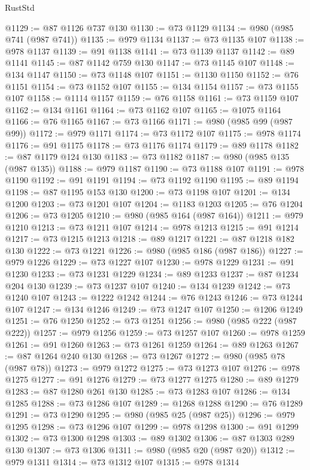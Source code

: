 \begin{lexlean}{RustStd}
\begin{coremodule}
@1129 := @87 @1126 @737 @130
@1130 := @73 @1129
@1134 := @980 (@985 @741 (@987 @741))
@1135 := @979 @1134
@1137 := @73 @1135 @107
@1138 := @978 @1137
@1139 := @91 @1138
@1141 := @73 @1139 @1137
@1142 := @89 @1141
@1145 := @87 @1142 @759 @130
@1147 := @73 @1145 @107
@1148 := @134 @1147
@1150 := @73 @1148 @107
@1151 := @1130 @1150
@1152 := @76 @1151
@1154 := @73 @1152 @107
@1155 := @134 @1154
@1157 := @73 @1155 @107
@1158 := @1114 @1157
@1159 := @76 @1158
@1161 := @73 @1159 @107
@1162 := @134 @1161
@1164 := @73 @1162 @107
@1165 := @1075 @1164
@1166 := @76 @1165
@1167 := @73 @1166
@1171 := @980 (@985 @99 (@987 @99))
@1172 := @979 @1171
@1174 := @73 @1172 @107
@1175 := @978 @1174
@1176 := @91 @1175
@1178 := @73 @1176 @1174
@1179 := @89 @1178
@1182 := @87 @1179 @124 @130
@1183 := @73 @1182
@1187 := @980 (@985 @135 (@987 @135))
@1188 := @979 @1187
@1190 := @73 @1188 @107
@1191 := @978 @1190
@1192 := @91 @1191
@1194 := @73 @1192 @1190
@1195 := @89 @1194
@1198 := @87 @1195 @153 @130
@1200 := @73 @1198 @107
@1201 := @134 @1200
@1203 := @73 @1201 @107
@1204 := @1183 @1203
@1205 := @76 @1204
@1206 := @73 @1205
@1210 := @980 (@985 @164 (@987 @164))
@1211 := @979 @1210
@1213 := @73 @1211 @107
@1214 := @978 @1213
@1215 := @91 @1214
@1217 := @73 @1215 @1213
@1218 := @89 @1217
@1221 := @87 @1218 @182 @130
@1222 := @73 @1221
@1226 := @980 (@985 @186 (@987 @186))
@1227 := @979 @1226
@1229 := @73 @1227 @107
@1230 := @978 @1229
@1231 := @91 @1230
@1233 := @73 @1231 @1229
@1234 := @89 @1233
@1237 := @87 @1234 @204 @130
@1239 := @73 @1237 @107
@1240 := @134 @1239
@1242 := @73 @1240 @107
@1243 := @1222 @1242
@1244 := @76 @1243
@1246 := @73 @1244 @107
@1247 := @134 @1246
@1249 := @73 @1247 @107
@1250 := @1206 @1249
@1251 := @76 @1250
@1252 := @73 @1251
@1256 := @980 (@985 @222 (@987 @222))
@1257 := @979 @1256
@1259 := @73 @1257 @107
@1260 := @978 @1259
@1261 := @91 @1260
@1263 := @73 @1261 @1259
@1264 := @89 @1263
@1267 := @87 @1264 @240 @130
@1268 := @73 @1267
@1272 := @980 (@985 @78 (@987 @78))
@1273 := @979 @1272
@1275 := @73 @1273 @107
@1276 := @978 @1275
@1277 := @91 @1276
@1279 := @73 @1277 @1275
@1280 := @89 @1279
@1283 := @87 @1280 @261 @130
@1285 := @73 @1283 @107
@1286 := @134 @1285
@1288 := @73 @1286 @107
@1289 := @1268 @1288
@1290 := @76 @1289
@1291 := @73 @1290
@1295 := @980 (@985 @25 (@987 @25))
@1296 := @979 @1295
@1298 := @73 @1296 @107
@1299 := @978 @1298
@1300 := @91 @1299
@1302 := @73 @1300 @1298
@1303 := @89 @1302
@1306 := @87 @1303 @289 @130
@1307 := @73 @1306
@1311 := @980 (@985 @20 (@987 @20))
@1312 := @979 @1311
@1314 := @73 @1312 @107
@1315 := @978 @1314

\end{coremodule}
\end{lexlean}
